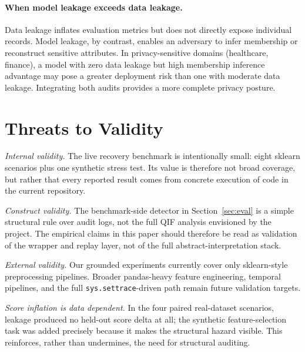 \documentclass[11pt]{article}
\begin{document}
\paragraph{When model leakage exceeds data leakage.}
Data leakage inflates evaluation metrics but does not directly expose
individual records.  Model leakage, by contrast, enables an adversary
to infer membership or reconstruct sensitive attributes.  In
privacy-sensitive domains (healthcare, finance), a model with zero
data leakage but high membership inference advantage may pose a
greater deployment risk than one with moderate data leakage.
Integrating both audits provides a more complete privacy posture.

\section{Threats to Validity}\label{sec:threats}

\emph{Internal validity.}  The live recovery benchmark is intentionally
small: eight sklearn scenarios plus one synthetic stress test.  Its
value is therefore not broad coverage, but rather that every reported
result comes from concrete execution of code in the current repository.

\emph{Construct validity.}  The benchmark-side detector in
Section~\ref{sec:eval} is a simple structural rule over audit logs, not
the full QIF analysis envisioned by the project.  The empirical claims
in this paper should therefore be read as validation of the wrapper and
replay layer, not of the full abstract-interpretation stack.

\emph{External validity.}  Our grounded experiments currently cover
only sklearn-style preprocessing pipelines.  Broader pandas-heavy
feature engineering, temporal pipelines, and the full
\texttt{sys.settrace}-driven path remain future validation targets.

\emph{Score inflation is data dependent.}  In the four paired
real-dataset scenarios, leakage produced no held-out score delta at all;
the synthetic feature-selection task was added precisely because it
makes the structural hazard visible.  This reinforces, rather than
undermines, the need for structural auditing.

\end{document}
